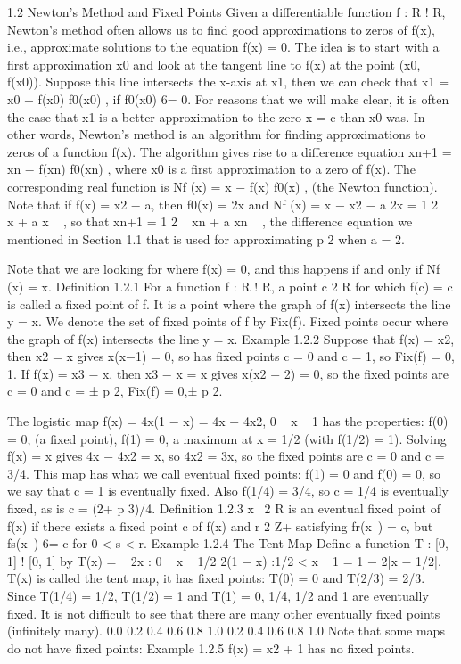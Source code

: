 \documentclass[12pt]{article}
\begin{document}
\begin{enumerate}
\begin{enumerate}
1.2 Newton’s Method and Fixed Points
Given a differentiable function f : R ! R, Newton’s method often allows us to
find good approximations to zeros of f(x), i.e., approximate solutions to the equation
f(x) = 0. The idea is to start with a first approximation x0 and look at the tangent
line to f(x) at the point (x0, f(x0)). Suppose this line intersects the x-axis at x1,
then we can check that
x1 = x0 −
f(x0)
f0(x0)
, if f0(x0) 6= 0.
For reasons that we will make clear, it is often the case that x1 is a better approximation
to the zero x = c than x0 was. In other words, Newton’s method is an algorithm
for finding approximations to zeros of a function f(x). The algorithm gives rise to a
difference equation
xn+1 = xn −
f(xn)
f0(xn)
,
where x0 is a first approximation to a zero of f(x). The corresponding real function
is
Nf (x) = x −
f(x)
f0(x)
, (the Newton function).
Note that if f(x) = x2 − a, then f0(x) = 2x and
Nf (x) = x −
x2 − a
2x
=
1
2
 
x +
a
x
 
,
so that
xn+1 =
1
2
 
xn +
a
xn
 
,
the difference equation we mentioned in Section 1.1 that is used for approximating p
2 when a = 2.

Note that we are looking for where f(x) = 0, and this happens if and only if
Nf (x) = x.
Definition 1.2.1 For a function f : R ! R, a point c 2 R for which f(c) = c is called
a fixed point of f. It is a point where the graph of f(x) intersects the line y = x. We
denote the set of fixed points of f by Fix(f).
Fixed points occur where the graph of f(x) intersects the line y = x.
Example 1.2.2 Suppose that f(x) = x2, then x2 = x gives x(x−1) = 0, so has fixed
points c = 0 and c = 1, so Fix(f) = {0, 1}. If f(x) = x3 − x, then x3 − x = x gives
x(x2 − 2) = 0, so the fixed points are c = 0 and c = ±
p
2, Fix(f) = {0,±
p
2}.

The logistic map f(x) = 4x(1 − x) = 4x − 4x2, 0   x   1 has the properties:
f(0) = 0, (a fixed point), f(1) = 0, a maximum at x = 1/2 (with f(1/2) = 1).
Solving f(x) = x gives 4x − 4x2 = x, so 4x2 = 3x, so the fixed points are c = 0 and
c = 3/4.
This map has what we call eventual fixed points: f(1) = 0 and f(0) = 0, so we say
that c = 1 is eventually fixed. Also f(1/4) = 3/4, so c = 1/4 is eventually fixed, as is
c = (2+
p
3)/4.
Definition 1.2.3 x  2 R is an eventual fixed point of f(x) if there exists a fixed point
c of f(x) and r 2 Z+ satisfying fr(x ) = c, but fs(x ) 6= c for 0 < s < r.
Example 1.2.4 The Tent Map
Define a function T : [0, 1] ! [0, 1] by
T(x) =
 
2x : 0   x   1/2
2(1 − x) :1/2 < x   1
= 1 − 2|x − 1/2|.
T(x) is called the tent map, it has fixed points: T(0) = 0 and T(2/3) = 2/3. Since
T(1/4) = 1/2, T(1/2) = 1 and T(1) = 0, 1/4, 1/2 and 1 are eventually fixed. It is not
difficult to see that there are many other eventually fixed points (infinitely many).
0.0 0.2 0.4 0.6 0.8 1.0
0.2
0.4
0.6
0.8
1.0
Note that some maps do not have fixed points:
Example 1.2.5 f(x) = x2 + 1 has no fixed points.


\end{enumerate}
\end{enumerate}
\end{document}
